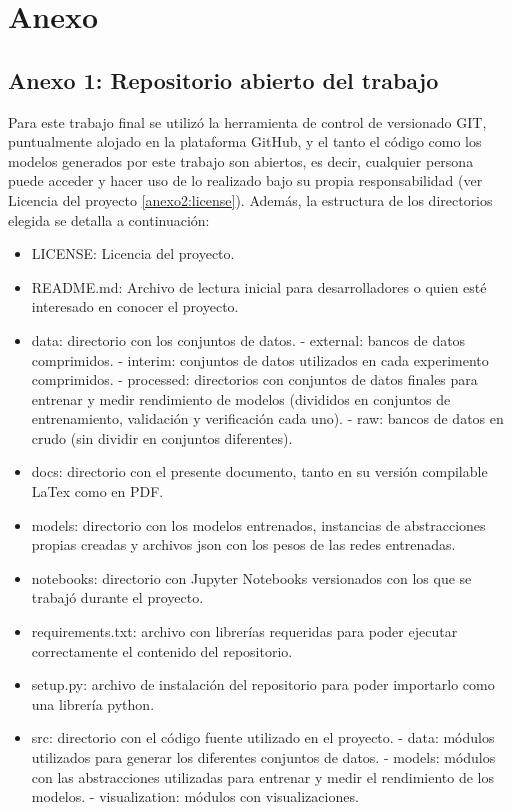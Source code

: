\section{Anexo}\label{sec:anexo}

\subsection{Anexo 1: Repositorio abierto del trabajo}
Para este trabajo final se utilizó la herramienta de control de versionado GIT, puntualmente alojado en la plataforma GitHub, y el tanto el código como los modelos generados por este trabajo son abiertos, es decir, cualquier persona puede acceder y hacer uso de lo realizado bajo su propia responsabilidad (ver Licencia del proyecto \ref{anexo2:license}). Además, la estructura de los directorios elegida se detalla a continuación:
\begin{itemize}
	\item LICENSE: Licencia del proyecto.
	\item README.md: Archivo de lectura inicial para desarrolladores o quien esté interesado en conocer el proyecto.
	\item data: directorio con los conjuntos de datos.
		\subitem - external: bancos de datos comprimidos.
		\subitem - interim: conjuntos de datos utilizados en cada experimento comprimidos.
		\subitem - processed: directorios con conjuntos de datos finales para entrenar y medir rendimiento de modelos (divididos en conjuntos de entrenamiento, validación y verificación cada uno).
		\subitem - raw: bancos de datos en crudo (sin dividir en conjuntos diferentes).
	\item docs: directorio con el presente documento, tanto en su versión compilable LaTex como en PDF.
	\item models: directorio con los modelos entrenados, instancias de abstracciones propias creadas y archivos json con los pesos de las redes entrenadas.
	\item notebooks: directorio con Jupyter Notebooks versionados con los que se trabajó durante el proyecto.
	\item requirements.txt: archivo con librerías requeridas para poder ejecutar correctamente el contenido del repositorio.
	\item setup.py: archivo de instalación del repositorio para poder importarlo como una librería python.
	\item src: directorio con el código fuente utilizado en el proyecto.
		\subitem - data: módulos utilizados para generar los diferentes conjuntos de datos.
		\subitem - models: módulos con las abstracciones utilizadas para entrenar y medir el rendimiento de los modelos.
		\subitem - visualization: módulos con visualizaciones.
\end{itemize}

